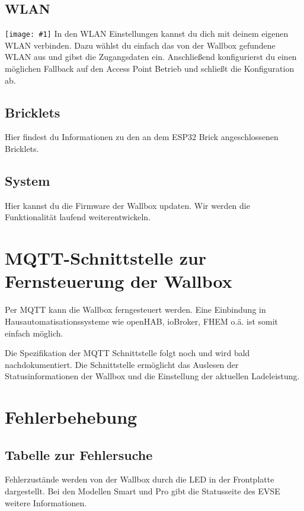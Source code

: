 \documentclass[a4paper,10pt]{article}
\newcommand{\gfx}[1]{\texttt{[image: \#1]}}
\begin{document}
\begin{multicols*}{2}
	\subsection{WLAN}
	\gfx{./img/resized/web_wifi}
	In den WLAN Einstellungen kannst du dich mit deinem eigenen WLAN verbinden. Dazu
	wählst du einfach das von der Wallbox gefundene WLAN aus und gibst die
	Zugangsdaten ein. Anschließend konfigurierst du einen möglichen Fallback auf
	den Access Point Betrieb und schließt die Konfiguration ab.
	
	\subsection{Bricklets}
	Hier findest du Informationen zu den an dem ESP32 Brick angeschlossenen
	Bricklets.

	\subsection{System}
	Hier kannst du die Firmware der Wallbox updaten. Wir werden die Funktionalität
	laufend weiterentwickeln.

	\section{MQTT-Schnittstelle zur Fernsteuerung der Wallbox}
	Per MQTT kann die Wallbox ferngesteuert werden. Eine Einbindung in
	Hausautomatisationssysteme wie openHAB, ioBroker, FHEM o.ä. ist somit einfach
	möglich.

	Die Spezifikation der MQTT Schnittstelle folgt noch und wird bald
	nachdokumentiert. Die Schnittstelle ermöglicht das Auslesen der
	Statusinformationen der Wallbox und die Einstellung der aktuellen Ladeleistung.
	\newpage \section{Fehlerbehebung}\label{fehlerbehebung} \subsection{Tabelle zur Fehlersuche}
	Fehlerzustände werden von der Wallbox durch die LED in der Frontplatte
	dargestellt. Bei den Modellen Smart und Pro gibt die Statusseite des EVSE
	weitere Informationen.


\end{multicols*}
\end{document}
